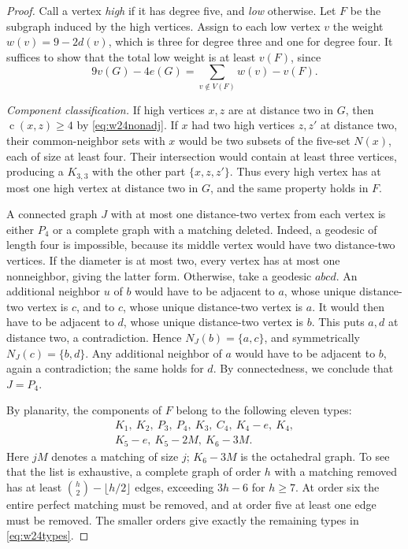 \documentclass[11pt,a4paper]{article}
\theoremstyle{remark}
\newcommand{\cdeg}{\operatorname{c}}
\begin{document}
\begin{proof}
Call a vertex \emph{high} if it has degree five, and \emph{low}
otherwise. Let $F$ be the subgraph induced by the high vertices.
Assign to each low vertex $v$ the weight $w(v)=9-2d(v)$, which is three
for degree three and one for degree four. It suffices to show that the
total low weight is at least $v(F)$, since
\begin{equation}\label{eq:w24weight}
 9v(G)-4e(G)=\sum_{v\notin V(F)}w(v)-v(F).
\end{equation}

\smallskip\noindent
\textit{Component classification.}
If high vertices $x,z$ are at distance two in $G$, then
$\cdeg(x,z)\geq4$ by \eqref{eq:w24nonadj}. If $x$ had two high
vertices $z,z'$ at distance two, their common-neighbor sets with $x$
would be two subsets of the five-set $N(x)$, each of size at least four.
Their intersection would contain at least three vertices, producing a
$K_{3,3}$ with the other part $\{x,z,z'\}$. Thus every high vertex has
at most one high vertex at distance two in $G$, and the same property
holds in $F$.

A connected graph $J$ with at most one distance-two vertex from each
vertex is either $P_4$ or a complete graph with a matching deleted.
Indeed, a geodesic of length four is impossible, because its middle
vertex would have two distance-two vertices. If the diameter is at most
two, every vertex has at most one nonneighbor, giving the latter form.
Otherwise, take a geodesic $a b c d$. An additional neighbor $u$ of $b$
would have to be adjacent to $a$, whose unique distance-two vertex is
$c$, and to $c$, whose unique distance-two vertex is $a$. It would then
have to be adjacent to $d$, whose unique distance-two vertex is $b$.
This puts $a,d$ at distance two, a contradiction. Hence
$N_J(b)=\{a,c\}$, and symmetrically $N_J(c)=\{b,d\}$. Any additional
neighbor of $a$ would have to be adjacent to $b$, again a contradiction;
the same holds for $d$. By connectedness, we conclude that $J=P_4$.

By planarity, the components of $F$ belong to the following eleven types:
\begin{equation}\label{eq:w24types}
 \begin{gathered}
 K_1,\ K_2,\ P_3,\ P_4,\ K_3,\ C_4,\ K_4-e,\ K_4,\\
 K_5-e,\ K_5-2M,\ K_6-3M.
 \end{gathered}
\end{equation}
Here $jM$ denotes a matching of size $j$; $K_6-3M$ is the octahedral
graph. To see that the list is exhaustive, a complete graph of order
$h$ with a matching removed has at least
$\binom h2-\lfloor h/2\rfloor$ edges, exceeding $3h-6$ for $h\geq7$.
At order six the entire perfect matching must be removed, and at order
five at least one edge must be removed. The smaller orders give exactly
the remaining types in \eqref{eq:w24types}.


\end{proof}
\end{document}
